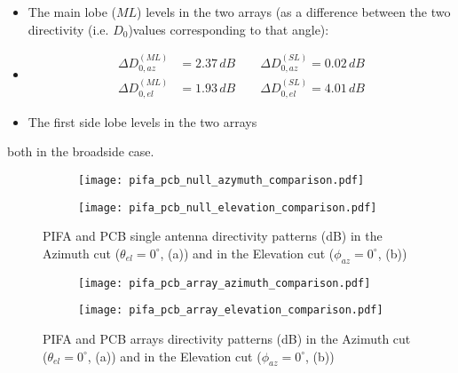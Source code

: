 \documentclass[12pt,a4paper]{article}
\begin{document}
{\begin{itemize}
		\begin{itemize}
			\item The main lobe ($ML$) levels in the two arrays (as a difference between the two directivity (i.e. $D_0$)values corresponding to that angle): 
			\item 
			\begin{equation}
				\begin{aligned}
					\Delta D_{0,az}^{(ML)} &= 2.37\,dB\qquad \Delta D_{0,az}^{(SL)} = 0.02\,dB\\
					\Delta D_{0,el}^{(ML)} &= 1.93\,dB\qquad \Delta D_{0,el}^{(SL)} = 4.01\,dB
				\end{aligned}
			\end{equation}
			\item The first side lobe levels in the two arrays
		\end{itemize}
		both in the broadside case. 
	\end{itemize}
	\begin{figure}[h]
		\begin{center}
			\begin{subfigure}{0.5\linewidth}
				\texttt{[image: pifa\_pcb\_null\_azymuth\_comparison.pdf]}
				\caption{}
			\end{subfigure}
			\begin{subfigure}{0.5\linewidth}
				\texttt{[image: pifa\_pcb\_null\_elevation\_comparison.pdf]}
				\caption{}	\end{subfigure}
			\caption{\selectfont
				\color{gray}
				PIFA and PCB single antenna directivity patterns (dB) in the Azimuth cut  ($\theta_{el}=0^\circ$, (a)) and in the Elevation cut ($\phi_{az}=0^\circ$, (b))}
		\end{center}  
	\end{figure}
	\begin{figure}[h]
		\begin{center}
			\begin{subfigure}{0.5\linewidth}
				\texttt{[image: pifa\_pcb\_array\_azimuth\_comparison.pdf]}
				\caption{}
			\end{subfigure}
			\begin{subfigure}{0.5\linewidth}
				\texttt{[image: pifa\_pcb\_array\_elevation\_comparison.pdf]}
				\caption{}	\end{subfigure}
			\caption{\selectfont
				\color{gray}
				PIFA and PCB arrays directivity patterns (dB) in the Azimuth cut  ($\theta_{el}=0^\circ$, (a)) and in the Elevation cut ($\phi_{az}=0^\circ$, (b))}
		\end{center}  
	\end{figure}
	
}
\end{document}
